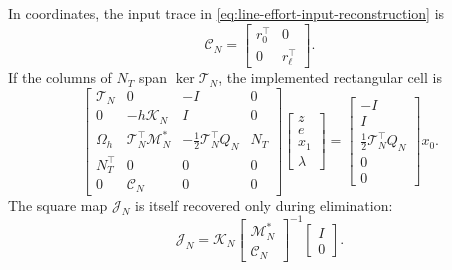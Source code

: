 \documentclass[11pt,a4paper]{article}
\begin{document}
In coordinates, the input trace in
\cref{eq:line-effort-input-reconstruction} is
\[
 \mathcal C_N=
 \begin{bmatrix}r_0^\top&0\\0&r_\ell^\top\end{bmatrix}.
\]
If the columns of \(N_T\) span \(\ker\mathcal T_N\), the implemented
rectangular cell is
\begin{equation}\label{eq:raw-rectangular-line-system}
\begin{bmatrix}
 \mathcal T_N&0&-I&0\\
 0&-h\mathcal K_N&I&0\\
 \Omega_h&\mathcal T_N^\top\mathcal M_N^*&
   -\tfrac12\mathcal T_N^\top Q_N&N_T\\
 N_T^\top&0&0&0\\
 0&\mathcal C_N&0&0
\end{bmatrix}
\begin{bmatrix}z\\e\\x_1\\\lambda\end{bmatrix}
=
\begin{bmatrix}
 -I\\I\\\tfrac12\mathcal T_N^\top Q_N\\0\\0
\end{bmatrix}x_0.
\end{equation}
The square map \(\mathcal J_N\) is itself recovered only during
elimination:
\begin{equation}\label{eq:rectangular-generator-recovery}
 \mathcal J_N=
 \mathcal K_N
 \begin{bmatrix}\mathcal M_N^*\\\mathcal C_N\end{bmatrix}^{-1}
 \begin{bmatrix}I\\0\end{bmatrix}.
\end{equation}
\end{document}
